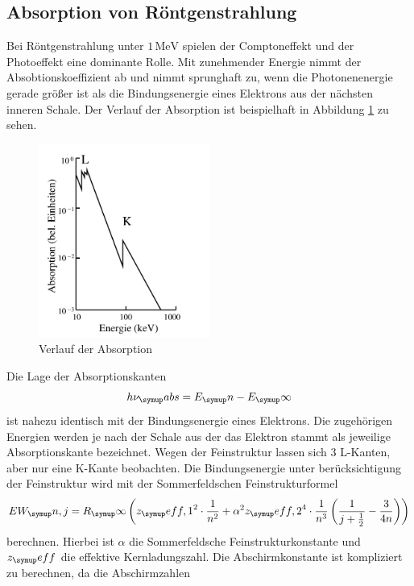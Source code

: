 \subsection{Absorption von Röntgenstrahlung}
Bei Röntgenstrahlung unter $1 \,\si{\mega\electronvolt}$ spielen der Comptoneffekt
und der Photoeffekt eine dominante Rolle.
Mit zunehmender Energie nimmt der Absobtionskoeffizient ab und nimmt
sprunghaft zu, wenn die Photonenenergie gerade größer ist als die Bindungsenergie
eines Elektrons aus der nächsten inneren Schale.
Der Verlauf der Absorption ist beispielhaft in Abbildung \ref{fig:absorb} zu sehen.
\begin{figure}
  \centering
  \includegraphics[width=0.5\textwidth]{bilder/absorb.pdf}
  \caption{Verlauf der Absorption\cite{V602}}
  \label{fig:absorb}
\end{figure}
Die Lage der Absorptionskanten
\begin{equation*}
  h\nu_\su{abs} = E_\su{n} - E_\su{\infty}
\end{equation*}
ist nahezu identisch mit der Bindungsenergie eines Elektrons. Die zugehörigen
Energien werden je nach der Schale aus der das Elektron stammt als jeweilige
Absorptionskante bezeichnet. %
Wegen der Feinstruktur lassen sich 3 L-Kanten, aber nur eine K-Kante beobachten.
Die Bindungsenergie unter berücksichtigung der Feinstruktur wird mit der
Sommerfeldschen Feinstrukturformel
\begin{equation}
  EW_\su{n, j}=R_\su{\infty}\left(z_\su{eff,1}^2\cdot\frac{1}{n^2}
  +\alpha^2 z_\su{eff,2}^4\cdot\frac{1}{n^3}\left(\frac{1}{j+\frac{1}{2}}-
  \frac{3}{4n}\right)\right)
  \label{eqn:sommerfeld}
\end{equation}
berechnen. Hierbei ist $\alpha$ die Sommerfeldsche Feinstrukturkonstante und
$z_\su{eff}$ die effektive Kernladungszahl.
Die Abschirmkonstante ist kompliziert zu berechnen, da die Abschirmzahlen
